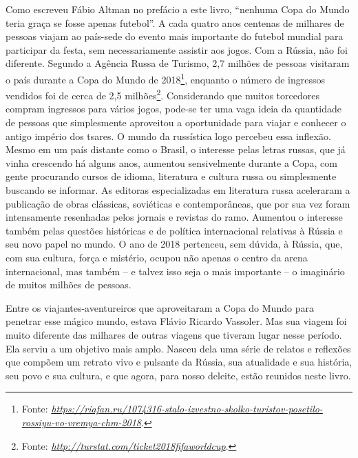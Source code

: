 Como escreveu Fábio Altman no prefácio a este livro, ``nenhuma Copa do
Mundo teria graça se fosse apenas futebol''. A cada quatro anos centenas
de milhares de pessoas viajam ao país-sede do evento mais importante do
futebol mundial para participar da festa, sem necessariamente assistir
aos jogos. Com a Rússia, não foi diferente. Segundo a Agência Russa de
Turismo, 2,7 milhões de pessoas visitaram o país durante a Copa do Mundo
de 2018\footnote{Fonte:
  \href{https://riafan.ru/1074316-stalo-izvestno-skolko-turistov-posetilo-rossiyu-vo-vremya-chm-2018}{\emph{https://riafan.ru/1074316-stalo-izvestno-skolko-turistov-posetilo-rossiyu-vo-vremya-chm-2018}}.},
enquanto o número de ingressos vendidos foi de cerca de 2,5
milhões\footnote{Fonte:
  \href{http://turstat.com/ticket2018fifaworldcup}{\emph{http://turstat.com/ticket2018fifaworldcup}}.}.
Considerando que muitos torcedores compram ingressos para vários jogos,
pode-se ter uma vaga ideia da quantidade de pessoas que simplesmente
aproveitou a oportunidade para viajar e conhecer o antigo império dos
tsares. O mundo da russística logo percebeu essa inflexão. Mesmo em um
país distante como o Brasil, o interesse pelas letras russas, que já
vinha crescendo há alguns anos, aumentou sensivelmente durante a Copa,
com gente procurando cursos de idioma, literatura e cultura russa ou
simplesmente buscando se informar. As editoras especializadas em
literatura russa aceleraram a publicação de obras clássicas, soviéticas
e contemporâneas, que por sua vez foram intensamente resenhadas pelos
jornais e revistas do ramo. Aumentou o interesse também pelas questões
históricas e de política internacional relativas à Rússia e seu novo
papel no mundo. O ano de 2018 pertenceu, sem dúvida, à Rússia, que, com
sua cultura, força e mistério, ocupou não apenas o centro da arena
internacional, mas também -- e talvez isso seja o mais importante -- o
imaginário de muitos milhões de pessoas.

Entre os viajantes-aventureiros que aproveitaram a Copa do Mundo para
penetrar esse mágico mundo, estava Flávio Ricardo Vassoler. Mas sua
viagem foi muito diferente das milhares de outras viagens que tiveram
lugar nesse período. Ela serviu a um objetivo mais amplo. Nasceu dela
uma série de relatos e reflexões que compõem um retrato vivo e pulsante
da Rússia, sua atualidade e sua história, seu povo e sua cultura, e que
agora, para nosso deleite, estão reunidos neste livro.

